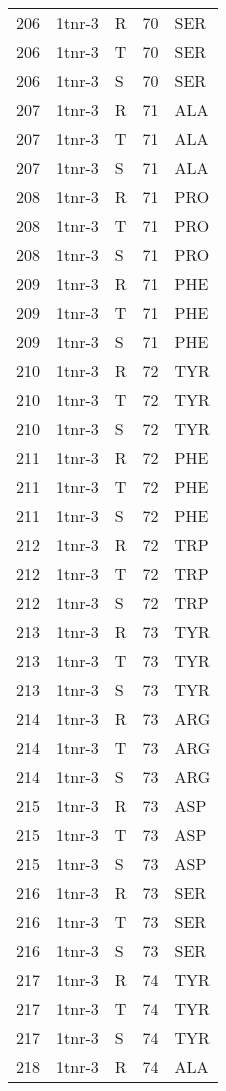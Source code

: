 \begin{tiny}
\begin{longtable}[l]{l|l|l|l|l}
	206 & 1tnr-3 & R & 70 & SER \\
	206 & 1tnr-3 & T & 70 & SER \\
	206 & 1tnr-3 & S & 70 & SER \\
	207 & 1tnr-3 & R & 71 & ALA \\
	207 & 1tnr-3 & T & 71 & ALA \\
	207 & 1tnr-3 & S & 71 & ALA \\
	208 & 1tnr-3 & R & 71 & PRO \\
	208 & 1tnr-3 & T & 71 & PRO \\
	208 & 1tnr-3 & S & 71 & PRO \\
	209 & 1tnr-3 & R & 71 & PHE \\
	209 & 1tnr-3 & T & 71 & PHE \\
	209 & 1tnr-3 & S & 71 & PHE \\
	210 & 1tnr-3 & R & 72 & TYR \\
	210 & 1tnr-3 & T & 72 & TYR \\
	210 & 1tnr-3 & S & 72 & TYR \\
	211 & 1tnr-3 & R & 72 & PHE \\
	211 & 1tnr-3 & T & 72 & PHE \\
	211 & 1tnr-3 & S & 72 & PHE \\
	212 & 1tnr-3 & R & 72 & TRP \\
	212 & 1tnr-3 & T & 72 & TRP \\
	212 & 1tnr-3 & S & 72 & TRP \\
	213 & 1tnr-3 & R & 73 & TYR \\
	213 & 1tnr-3 & T & 73 & TYR \\
	213 & 1tnr-3 & S & 73 & TYR \\
	214 & 1tnr-3 & R & 73 & ARG \\
	214 & 1tnr-3 & T & 73 & ARG \\
	214 & 1tnr-3 & S & 73 & ARG \\
	215 & 1tnr-3 & R & 73 & ASP \\
	215 & 1tnr-3 & T & 73 & ASP \\
	215 & 1tnr-3 & S & 73 & ASP \\
	216 & 1tnr-3 & R & 73 & SER \\
	216 & 1tnr-3 & T & 73 & SER \\
	216 & 1tnr-3 & S & 73 & SER \\
	217 & 1tnr-3 & R & 74 & TYR \\
	217 & 1tnr-3 & T & 74 & TYR \\
	217 & 1tnr-3 & S & 74 & TYR \\
	218 & 1tnr-3 & R & 74 & ALA \\

\end{longtable}
\end{tiny}
